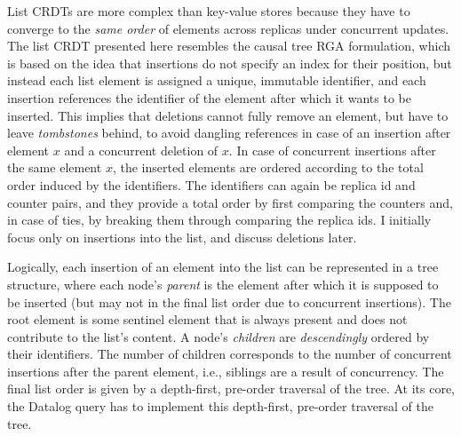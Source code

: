 List \acp{CRDT} are more complex than key-value stores because they have to
converge to the \emph{same order} of elements across replicas under concurrent
updates.
The list \ac{CRDT} presented here resembles the causal tree \ac{RGA} formulation,
which is based on the idea that insertions do not specify an index for their
position, but instead each list element is assigned a unique, immutable identifier,
and each insertion references the identifier of the element after which it wants
to be inserted.
This implies that deletions cannot fully remove an element, but have to leave
\emph{tombstones} behind, to avoid dangling references in case of an
insertion after element \(x\) and a concurrent deletion of \(x\).
In case of concurrent insertions after the same element \(x\),
the inserted elements are ordered according to the total order induced
by the identifiers.
The identifiers can again be replica id and counter pairs,
and they provide a total order by first comparing the counters and,
in case of ties, by breaking them through comparing the replica ids.
I initially focus only on insertions into the list, and discuss deletions later.

Logically, each insertion of an element into the list can be represented in a
tree structure, where each node's \emph{parent} is the element after which it
is supposed to be inserted (but may not in the final list order due to
concurrent insertions).
The root element is some sentinel element that is always present and does not
contribute to the list's content.
A node's \emph{children} are \emph{descendingly} ordered by their identifiers.
The number of children corresponds to the number of concurrent insertions
after the parent element, i.e., siblings are a result of concurrency.
The final list order is given by a depth-first, pre-order traversal of the tree.
At its core, the Datalog query has to implement this depth-first, pre-order
traversal of the tree.

